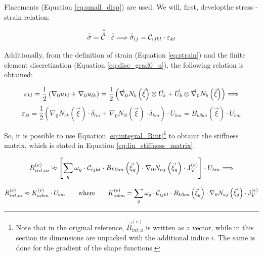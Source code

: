Flacements (Equation \ref{eq:small_disp}) are used. We will, first, developthe stress - strain relation:

\begin{equation*}
    \bar{\bar{\sigma}} = \bar{\bar{\bar{\bar{\mathcal{C}}}}} : \bar{\bar{\varepsilon}} \Longrightarrow \bar{\bar{\sigma}}_{ij} = \mathcal{C}_{ijkl} \cdot \varepsilon_{kl}
\end{equation*}

Additionally, from the definition of strain (Equation \ref{eq:strain}) and the finite element discretization (Equation \ref{eq:disc_grad0_u}), the following relation is obtained:

\begin{equation*}
    \varepsilon_{kl} = \frac{1}{2} \left(\nabla_0 u_{kl} + \nabla_0 u_{lk} \right) = \frac{1}{2} \left(\vec{\nabla}_\mathrm{0} N_b \left(\vec{\xi} \right) \otimes \vec{U}_b + \vec{U}_b \otimes \vec{\nabla}_\mathrm{0} N_b \left(\vec{\xi} \right)  \right) \Longrightarrow
\end{equation*}
\begin{equation}
    \varepsilon_{kl} = \frac{1}{2} \left(\nabla_\mathrm{0} N_{bk} \left(\vec{\xi} \right) \cdot \delta_{lm} + \nabla_\mathrm{0} N_{bl} \left(\vec{\xi} \right) \cdot \delta_{km}  \right) \cdot U_{bm} = B_{klbm} \left(\vec{\xi} \right) \cdot U_{bm}
\end{equation}

So, it is possible to use Equation \ref{eq:integral_Rint}\footnote{Note that in the original reference, $\vec{R}_{int,a}^{(e)}$  is written as a vector, while in this section its dimensions are unpacked with the additional indice $i$. The same is done for the gradient of the shape functions.} to obtaint the stiffness matrix, which is stated in Equation \ref{eq:lin_stiffness_matrix}.

\begin{equation*}
    R_{int,ai}^{(e)} \approx \left[ \sum_g \omega_g \cdot   \mathcal{C}_{ijkl} \cdot B_{klbm} \left(\vec{\xi}_g \right) \cdot \nabla_\mathrm{0} N_{aj} \left(\vec{\xi}_g \right) \cdot \mathrm{J}_V^{(e)} \right] \cdot U_{bm} \Longrightarrow
\end{equation*}

\begin{equation} \label{eq:lin_stiffness_matrix}
    R_{int,ai}^{(e)} \approx K_{aibm}^{(e)} \cdot U_{bm} \qquad \text{where} \qquad K_{aibm}^{(e)} = \sum_g \omega_g \cdot \mathcal{C}_{ijkl} \cdot B_{klbm} \left(\vec{\xi}_g \right) \cdot \nabla_\mathrm{0} N_{aj} \left(\vec{\xi}_g \right) \cdot \mathrm{J}_V^{(e)}
\end{equation}

